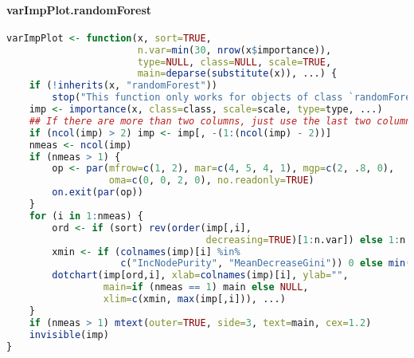 \documentclass[10pt,a4paper]{article}
\begin{document}
\paragraph{varImpPlot.randomForest}
\begin{lstlisting}[language=R]
varImpPlot <- function(x, sort=TRUE,
                       n.var=min(30, nrow(x$importance)),
                       type=NULL, class=NULL, scale=TRUE, 
                       main=deparse(substitute(x)), ...) {
    if (!inherits(x, "randomForest"))
        stop("This function only works for objects of class `randomForest'")
    imp <- importance(x, class=class, scale=scale, type=type, ...)
    ## If there are more than two columns, just use the last two columns.
    if (ncol(imp) > 2) imp <- imp[, -(1:(ncol(imp) - 2))]
    nmeas <- ncol(imp)
    if (nmeas > 1) {
        op <- par(mfrow=c(1, 2), mar=c(4, 5, 4, 1), mgp=c(2, .8, 0),
                  oma=c(0, 0, 2, 0), no.readonly=TRUE)
        on.exit(par(op))
    }
    for (i in 1:nmeas) {
        ord <- if (sort) rev(order(imp[,i],
                                   decreasing=TRUE)[1:n.var]) else 1:n.var
        xmin <- if (colnames(imp)[i] %in%
                    c("IncNodePurity", "MeanDecreaseGini")) 0 else min(imp[ord, i])
        dotchart(imp[ord,i], xlab=colnames(imp)[i], ylab="",
                 main=if (nmeas == 1) main else NULL,
                 xlim=c(xmin, max(imp[,i])), ...)
    }
    if (nmeas > 1) mtext(outer=TRUE, side=3, text=main, cex=1.2)
    invisible(imp)
}
\end{lstlisting}
\end{document}
